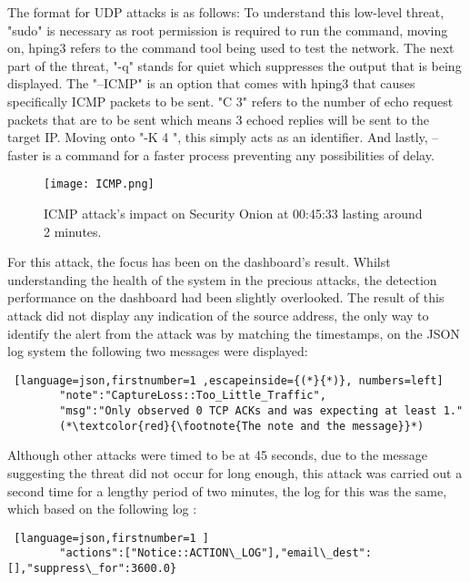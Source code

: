 \documentclass[12pt]{article}
\begin{document}
		
		The format for UDP attacks is as follows:
		To understand this low-level threat, "sudo" is necessary as root permission is required to run the command, moving on, hping3 refers to the command tool being used to test the network. The next part of the threat, "-q" stands for quiet which suppresses the output that is being displayed. The "--ICMP" is an option that comes with hping3 that causes specifically ICMP packets to be sent. "C 3" refers to the number of echo request packets that are to be sent which means 3 echoed replies will be sent to the target IP. Moving onto "-K 4 ", this simply acts as an identifier. And lastly, --faster is a command for a faster process preventing any possibilities of delay.
		\begin{center}
		
		\begin{figure}[H]
			\centering
			\texttt{[image: ICMP.png]}
			\caption{ICMP attack's impact on Security Onion at 00:45:33 lasting around 2 minutes. } 
			\label{fig:memory2}
		\end{figure}
		\end{center}
		For this attack, the focus has been on the dashboard's result. Whilst understanding the health of the system in the precious attacks, the detection performance on the dashboard had been slightly overlooked. The result of this attack did not display any indication of the source address, the only way to identify the alert from the attack was by matching the timestamps, on the JSON log system the following two messages were displayed:
		\begin{lstlisting} [language=json,firstnumber=1 ,escapeinside={(*}{*)}, numbers=left]
		"note":"CaptureLoss::Too_Little_Traffic",
		"msg":"Only observed 0 TCP ACKs and was expecting at least 1."
		(*\textcolor{red}{\footnote{The note and the message}}*) \end{lstlisting} 
		
		Although other attacks were timed to be at 45 seconds, due to the message suggesting the threat did not occur for long enough, this attack was carried out a second time for a lengthy period of two minutes, the log for this was the same, which based on the following log :
		
		
		
		\begin{lstlisting} [language=json,firstnumber=1 ]
		"actions":["Notice::ACTION\_LOG"],"email\_dest":[],"suppress\_for":3600.0}
		
	\end{lstlisting} 
\end{document}
